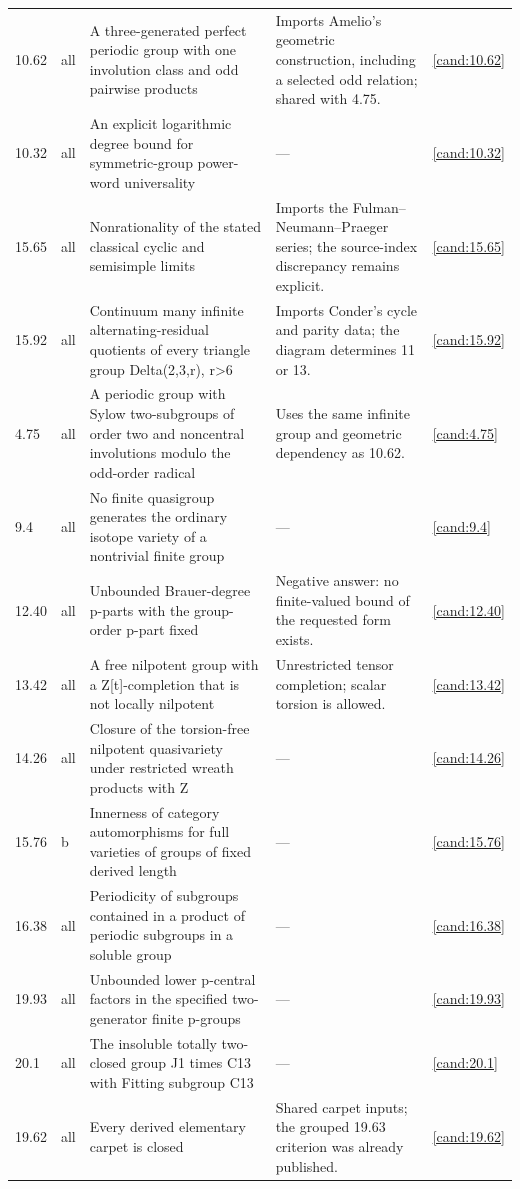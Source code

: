 \begin{longtable}{@{}p{}p{}>{\raggedright\arraybackslash}p{}>{\raggedright\arraybackslash}p{}p{}@{}}
10.62 & all & A three-generated perfect periodic group with one involution class and odd pairwise products & Imports Amelio's geometric construction, including a selected odd relation; shared with 4.75. & \ref{cand:10.62} \\
10.32 & all & An explicit logarithmic degree bound for symmetric-group power-word universality & --- & \ref{cand:10.32} \\
15.65 & all & Nonrationality of the stated classical cyclic and semisimple limits & Imports the Fulman--Neumann--Praeger series; the source-index discrepancy remains explicit. & \ref{cand:15.65} \\
15.92 & all & Continuum many infinite alternating-residual quotients of every triangle group Delta(2,3,r), r>6 & Imports Conder's cycle and parity data; the diagram determines 11 or 13. & \ref{cand:15.92} \\
4.75 & all & A periodic group with Sylow two-subgroups of order two and noncentral involutions modulo the odd-order radical & Uses the same infinite group and geometric dependency as 10.62. & \ref{cand:4.75} \\
9.4 & all & No finite quasigroup generates the ordinary isotope variety of a nontrivial finite group & --- & \ref{cand:9.4} \\
12.40 & all & Unbounded Brauer-degree p-parts with the group-order p-part fixed & Negative answer: no finite-valued bound of the requested form exists. & \ref{cand:12.40} \\
13.42 & all & A free nilpotent group with a Z[t]-completion that is not locally nilpotent & Unrestricted tensor completion; scalar torsion is allowed. & \ref{cand:13.42} \\
14.26 & all & Closure of the torsion-free nilpotent quasivariety under restricted wreath products with Z & --- & \ref{cand:14.26} \\
15.76 & b & Innerness of category automorphisms for full varieties of groups of fixed derived length & --- & \ref{cand:15.76} \\
16.38 & all & Periodicity of subgroups contained in a product of periodic subgroups in a soluble group & --- & \ref{cand:16.38} \\
19.93 & all & Unbounded lower p-central factors in the specified two-generator finite p-groups & --- & \ref{cand:19.93} \\
20.1 & all & The insoluble totally two-closed group J1 times C13 with Fitting subgroup C13 & --- & \ref{cand:20.1} \\
19.62 & all & Every derived elementary carpet is closed & Shared carpet inputs; the grouped 19.63 criterion was already published. & \ref{cand:19.62} \\

\end{longtable}
